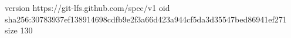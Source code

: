 version https://git-lfs.github.com/spec/v1
oid sha256:30783937ef138914698cdfb9e2f3a66d423a944cf5da3d35547bed86941ef271
size 130
